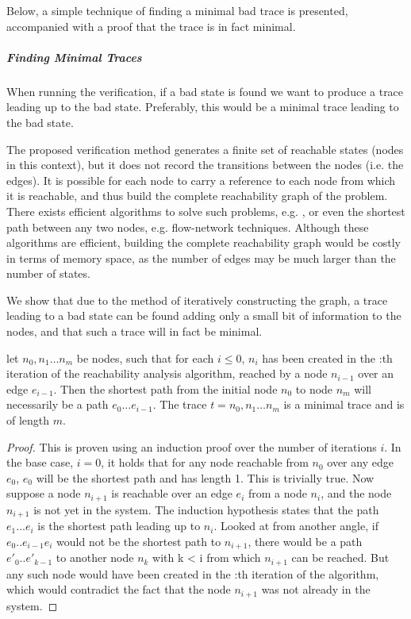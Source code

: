 Below, a simple technique of finding a minimal bad trace is presented, accompanied with a proof that the trace is in fact minimal.

\subparagraph{Finding Minimal Traces}
When running the verification, if a bad state is found we want to produce a trace leading up to the bad state. Preferably, this would be a minimal trace leading to the bad state.

The proposed verification method generates a finite set of reachable states (nodes in this context), but it does not record the transitions between the nodes (i.e. the edges). It is possible for each node  to carry a reference to each node  from which it is reachable, and thus build the complete reachability graph of the problem. There exists efficient algorithms to solve such problems, e.g. , or even the shortest path between any two nodes, e.g. flow-network techniques. Although these algorithms are efficient, building the complete reachability graph would be costly in terms of memory space, as the number of edges may be much larger than the number of states.

We show that due to the method of iteratively constructing the graph, a trace leading to a bad state can be found adding only a small bit of information to the nodes, and that such a trace will in fact be minimal.

\begin{lemma}
let $n_0,n_1\ldots n_m$ be nodes, such that for each $i \leq 0$, $n_i$ has been created in the :th iteration of the reachability analysis algorithm, reached by a node $n_{i-1}$ over an edge $e_{i-1}$. Then the shortest path from the initial node $n_0$ to node $n_m$ will necessarily be a path $e_0...e_{i-1}$. The trace $t = n_0,n_1\ldots n_m$ is a minimal trace and is of length $m$.
\end{lemma}

\begin{proof}
This is proven using an induction proof over the number of iterations $i$. In the base case, $i=0$, it holds that for any node reachable from $n_0$ over any edge $e_0$, $e_0$ will be the shortest path and has length 1. This is trivially true. Now suppose a node $n_{i+1}$ is reachable over an edge $e_i$ from a node $n_i$, and the node $n_{i+1}$ is not yet in the system. The induction hypothesis states that the path $e_1...e_i$ is the shortest path leading up to $n_i$.
Looked at from another angle, if $e_0..e_{i-1}e_i$ would not be the shortest path to $n_{i+1}$, there would be a path $e'_0..e'_{k-1}$ to another node $n_k$ with k < i from which $n_{i+1}$ can be reached. But any such node would have been created in the :th iteration of the algorithm, which would contradict the fact that the node $n_{i+1}$ was not already in the system.
\end{proof}

